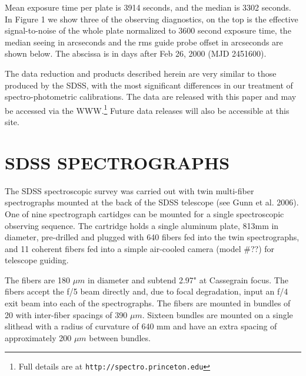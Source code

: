\documentclass[12pt,preprint]{aastex}
\begin{document}
Mean exposure time per plate is 3914 seconds, and the median is 3302 seconds.
In Figure 1 we show three of the observing diagnostics, on the top is
the effective signal-to-noise of the whole plate normalized to 3600 second
exposure time, the median seeing in arcseconds and the rms guide probe offset
in arcseconds are shown below.  The abscissa is in days after Feb 26, 2000
(MJD 2451600).



The data reduction and products described herein are very similar to
those produced by the SDSS, with the most significant differences
in our treatment of spectro-photometric calibrations.
The data are released
with this paper and may be accessed via the WWW.\footnote{Full details
are at \texttt{http://spectro.princeton.edu}}
Future data releases will also be accessible at this site. 

\section{SDSS SPECTROGRAPHS}
\label{sec_spectrographs}

The SDSS spectroscopic survey was carried out with twin multi-fiber 
spectrographs mounted at the back of the SDSS telescope (see Gunn et al.
2006).  One of nine spectrograph cartidges can be mounted for a single
spectroscopic observing sequence.  The cartridge holds a single aluminum
plate, 813mm in diameter, pre-drilled and plugged with 640 fibers 
fed into the twin spectrographs, 
and 11 coherent fibers fed into a simple air-cooled camera (model \#??)
for telescope guiding.

The fibers are 180 $\mu m$ in diameter and subtend 2.97" at Cassegrain focus.
The fibers accept the f/5 beam directly and, due to focal degradation, input
an f/4 exit beam into each of the spectrographs.  The fibers are mounted in
bundles of 20 with inter-fiber spacings of 390 $\mu m$.  Sixteen bundles are
mounted on a single slithead with a radius of curvature of 640 mm and have
an extra spacing of approximately 200 $\mu m$ between bundles.
\end{document}
